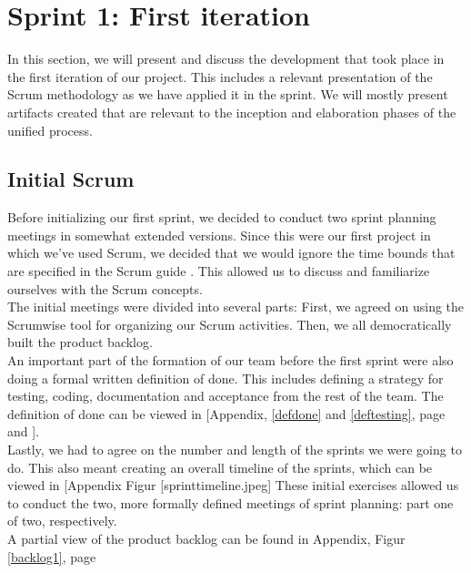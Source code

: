 \section{Sprint 1: First iteration}
In this section, we will present and discuss the development that took place in the first iteration of our project. This includes a relevant presentation of the Scrum methodology as we have applied it in the sprint. We will mostly present artifacts created that are relevant to the inception and elaboration phases of the unified process.
\subsection{Initial Scrum}
Before initializing our first sprint, we decided to conduct two sprint planning meetings in somewhat extended versions. Since this were our first project in which we've used Scrum, we decided that we would ignore the time bounds that are specified in the Scrum guide \cite[p.~9]{scrumguide}. This allowed us to discuss and familiarize ourselves with the Scrum concepts.\\
The initial meetings were divided into several parts: First, we agreed on using the Scrumwise \cite{scrumwise} tool for organizing our Scrum activities. Then, we all democratically built the product backlog. \\
An important part of the formation of our team before the first sprint were also doing a formal written definition of done. This includes defining a strategy for testing, coding, documentation and acceptance from the rest of the team. The definition of done can be viewed in [Appendix, \ref{defdone} and \ref{deftesting}, page \pageref{defdone} and \pageref{deftesting}].\\
Lastly, we had to agree on the number and length of the sprints we were going to do. This also meant creating an overall timeline of the sprints, which can be viewed in [Appendix Figur [sprinttimeline.jpeg]  These initial exercises allowed us to conduct the two, more formally defined meetings of sprint planning: part one of two, respectively. \\
A partial view of the product backlog can be found in Appendix, Figur \ref{backlog1}, page \pageref{backlog1} 
